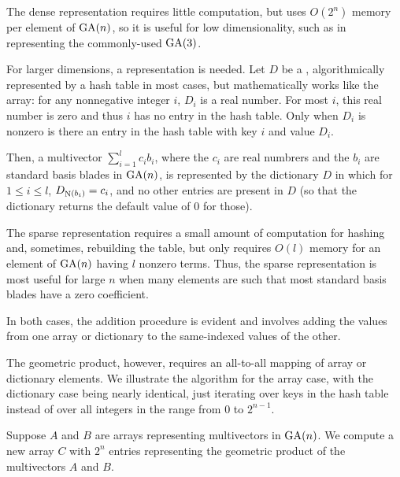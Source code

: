 \documentclass{amsproc}
\theoremstyle{definition}
\theoremstyle{remark}
\numberwithin{equation}{section}
\begin{document}
The dense representation requires little computation, but uses
$O(2^n)$ memory per element of $\mathop{\mathrm{GA}}(n)$, so it is useful for low
dimensionality, such as in representing the commonly-used $\mathop{\mathrm{GA}}(3)$.

For larger dimensions, a  representation is needed.  Let
$D$ be a , algorithmically represented by a hash
table in most cases, but mathematically works like the array: for any
nonnegative integer $i$, $D_i$ is a real number.  For most $i$, this
real number is zero and thus $i$ has no entry in the hash table.  Only
when $D_i$ is nonzero is there an entry in the hash table with key $i$
and value $D_i$. 
  
Then, a multivector $\sum_{i=1}^{l}c_ib_i$, where the $c_i$ are real
numbrers and the $b_i$ are standard basis blades in $\mathop{\mathrm{GA}}(n)$, is
represented by the dictionary $D$ in which for $1\le{i}\le{l}$,
$D_{\mathop{\mathrm{N}}(b_i)} = c_i$, and no other entries are present in $D$ (so that
the dictionary returns the default value of 0 for those).

The sparse representation requires a small amount of computation for
hashing and, sometimes, rebuilding the table, but only requires $O(l)$
memory for an element of $\mathop{\mathrm{GA}}(n)$ having $l$ nonzero terms.  Thus, the
sparse representation is most useful for large $n$ when many elements
are such that most standard basis blades have a zero coefficient.

In both cases, the addition procedure is evident and involves adding
the values from one array or dictionary to the same-indexed values of
the other.

The geometric product, however, requires an all-to-all mapping of
array or dictionary elements.  We illustrate the algorithm for the
array case, with the dictionary case being nearly identical, just
iterating over keys in the hash table instead of over all integers in
the range from $0$ to $2^{n-1}$.

Suppose $A$ and $B$ are arrays representing multivectors in $\mathop{\mathrm{GA}}(n)$.
We compute a new array $C$ with $2^n$ entries representing the
geometric product of the multivectors $A$ and $B$.
\end{document}
